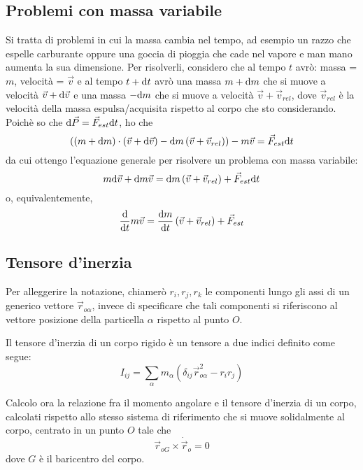 \documentclass[../main.tex]{subfiles}
\begin{document}
\subsection{Problemi con massa variabile}
Si tratta di problemi in cui la massa cambia nel tempo, ad esempio un razzo che espelle carburante oppure una goccia di pioggia che cade nel vapore e man mano aumenta la sua dimensione.
Per risolverli, considero che al tempo $t$ avrò:
massa = $m$, velocità = $\vec v$
e al tempo $t+\mathrm{d} t$ avrò una massa $m+\mathrm{d} m$ che si muove a velocità $\vec v + \mathrm{d} \vec v$ e una massa $-\mathrm{d} m$ che si muove a velocità $\vec v + \vec v_{rel}$, dove $\vec v_{rel}$ è la velocità della massa espulsa/acquisita rispetto al corpo che sto considerando.
Poichè so che $\mathrm{d} \vec P = \vec F_{est} \mathrm{d} t$, ho che
$$ \left ( \left ( m + \mathrm{d} m \right ) \cdot \left ( \vec v + \mathrm{d} \vec v\right ) -\mathrm{d} m\left ( \vec v + \vec v_{rel} \right ) \right ) - m\vec v = \vec F_{est}\mathrm{d} t$$
da cui ottengo l'equazione generale per risolvere un problema con massa variabile:
\begin{equation}\label{MassaVariabile}
	m \mathrm{d} \vec v + \mathrm{d} m \vec v = \mathrm{d} m \left ( \vec v + \vec v_{rel} \right ) + \vec F_{est} \mathrm{d} t
\end{equation}
o, equivalentemente,
\begin{equation}
	\frac{\mathrm{d} }{\mathrm{d} t} m\vec v = \frac{\mathrm{d} m}{\mathrm{d} t}\left ( \vec v + \vec v_{rel} \right ) + \vec F_{est}
\end{equation}



\subsection{Tensore d'inerzia}
Per alleggerire la notazione, chiamerò $r_i, r_j, r_k$ le componenti lungo gli assi di un generico vettore $\vec r_{o\alpha}$, invece di specificare che tali componenti si riferiscono al vettore posizione della particella $\alpha$ rispetto al punto $O$.

Il tensore d'inerzia di un corpo rigido è un tensore a due indici definito come segue:
\begin{equation} \label{ten:definition}
	I_{ij}=\sum_\alpha m_\alpha(\delta_{ij}\vec r_{o\alpha}^2 -r_ir_j)
\end{equation}

Calcolo ora la relazione fra il momento angolare e il tensore d'inerzia di un corpo, calcolati rispetto allo stesso sistema di riferimento che si muove solidalmente al corpo, centrato in un punto $O$ tale che
\begin{equation} \label{ten:PointCondition}
	\vec{r}_{oG}\times \dot{\vec r}_o=0
\end{equation}
dove $G$ è il baricentro del corpo.
\end{document}
